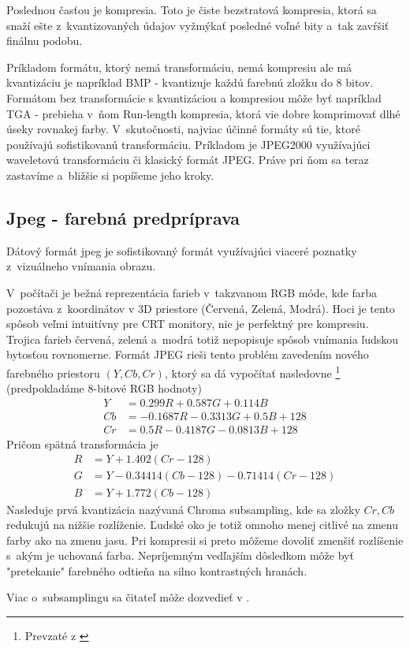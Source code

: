 Poslednou časťou je kompresia. Toto je čiste bezstratová kompresia,
ktorá sa snaží ešte z~kvantizovaných údajov vyžmýkať posledné voľné
bity a~tak zavŕšiť finálnu podobu.

Príkladom formátu, ktorý nemá transformáciu, nemá kompresiu ale má
kvantizáciu je napríklad BMP - kvantizuje každú farebnú zložku do 8
bitov. Formátom bez transformácie s kvantizáciou a kompresiou môže byť
napríklad TGA - prebieha v~ňom Run-length kompresia, ktorá vie dobre
komprimovať dlhé úseky rovnakej farby.
V~skutočnosti, najviac účinné formáty sú tie, ktoré používajú
sofistikovanú transformáciu. Príkladom je JPEG2000 využívajúci
waveletovú transformáciu či klasický formát JPEG. Práve pri ňom sa
teraz zastavíme a~bližšie si popíšeme jeho kroky.

\subsection{Jpeg - farebná predpríprava}
Dátový formát jpeg je sofistikovaný formát využívajúci viaceré
poznatky z~vizuálneho vnímania obrazu.

V~počítači je bežná reprezentácia farieb v~takzvanom RGB móde, kde
farba pozostáva z~koordinátov v 3D priestore (Červená, Zelená, Modrá).
Hoci je tento spôsob veľmi intuitívny pre CRT monitory, nie je
perfektný pre kompresiu. Trojica farieb červená, zelená a~modrá totiž
nepopisuje spôsob vnímania ľudskou bytosťou rovnomerne. Formát JPEG
rieši tento problém zavedením nového farebného priestoru $(Y,Cb,Cr)$,
ktorý sa dá vypočítať nasledovne \footnote{Prevzaté z \cite{jfif}} 
(predpokladáme 8-bitové RGB hodnoty)
\begin{align*}
    Y &= 0.299 R + 0.587 G + 0.114 B \\
    Cb &= -0.1687R - 0.3313G + 0.5B + 128 \\
    Cr &= 0.5R - 0.4187 G - 0.0813B + 128
\end{align*}
Pričom spätná transformácia je
\begin{align*}
    R &= Y + 1.402 (Cr - 128) \\
    G &= Y - 0.34414 (Cb-128) - 0.71414 (Cr-128) \\
    B &= Y + 1.772 (Cb - 128)
\end{align*}
Nasleduje prvá kvantizácia nazývaná Chroma subsampling, 
kde sa zložky  $Cr, Cb$ redukujú na nižšie
rozlíženie. Ľudské oko je totiž omnoho menej citlivé na zmenu farby
ako na zmenu jasu. Pri kompresii si preto môžeme dovoliť zmenšiť
rozlíšenie s~akým je uchovaná farba.
Nepríjemným vedľajším dôsledkom môže byť "pretekanie" farebného
odtieňa na silno kontrastných hranách.
\begin{poznamka}
Viac o~subsamplingu sa čitateľ môže dozvedieť v 
\cite{subsampling}.
\nocite{wiki:chroma}
\end{poznamka}


